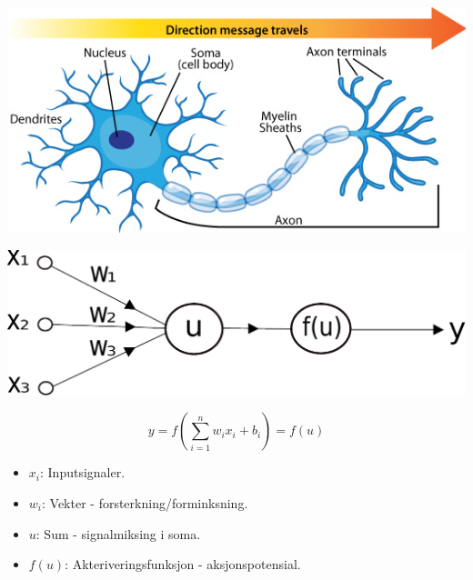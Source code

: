 \documentclass{beamer}
\begin{document}
\begin{frame}
 
\centering
\includegraphics[width=0.8\linewidth]{../Figures/Theory/neuron_anatomy.jpg} 

\end{frame}


\begin{frame}

\centering
\includegraphics[width=0.8\linewidth]{../Figures/Theory/neuron.pdf} 

\begin{equation*}
 y = f\left(\sum_{i=1}^n w_ix_i + b_i\right) = f(u)
\end{equation*}

\begin{itemize}
 \item $x_i$: Inputsignaler.
 \item $w_i$: Vekter - forsterkning/forminksning.  
 \item $u$: Sum - signalmiksing i soma.
 \item $f(u)$: Akteriveringsfunksjon - aksjonspotensial.
\end{itemize}

\end{frame}
\end{document}
